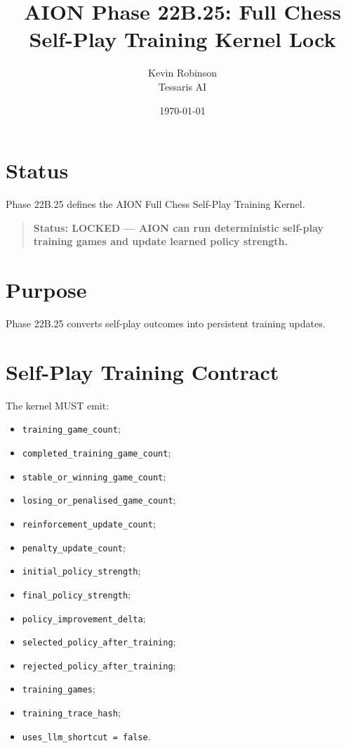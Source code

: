 \documentclass[11pt,a4paper]{article}
\title{\textbf{AION Phase 22B.25: Full Chess Self-Play Training Kernel Lock}}
\author{Kevin Robinson\\Tessaris AI}
\date{\today}
\begin{document}
\maketitle

\section{Status}

Phase 22B.25 defines the AION Full Chess Self-Play Training Kernel.

\begin{quote}
\textbf{Status: LOCKED --- AION can run deterministic self-play training games and update learned policy strength.}
\end{quote}

\section{Purpose}

Phase 22B.25 converts self-play outcomes into persistent training updates.

\section{Self-Play Training Contract}

The kernel MUST emit:

\begin{itemize}
  \item \texttt{training\_game\_count};
  \item \texttt{completed\_training\_game\_count};
  \item \texttt{stable\_or\_winning\_game\_count};
  \item \texttt{losing\_or\_penalised\_game\_count};
  \item \texttt{reinforcement\_update\_count};
  \item \texttt{penalty\_update\_count};
  \item \texttt{initial\_policy\_strength};
  \item \texttt{final\_policy\_strength};
  \item \texttt{policy\_improvement\_delta};
  \item \texttt{selected\_policy\_after\_training};
  \item \texttt{rejected\_policy\_after\_training};
  \item \texttt{training\_games};
  \item \texttt{training\_trace\_hash};
  \item \texttt{uses\_llm\_shortcut = false}.
\end{itemize}
\end{document}
